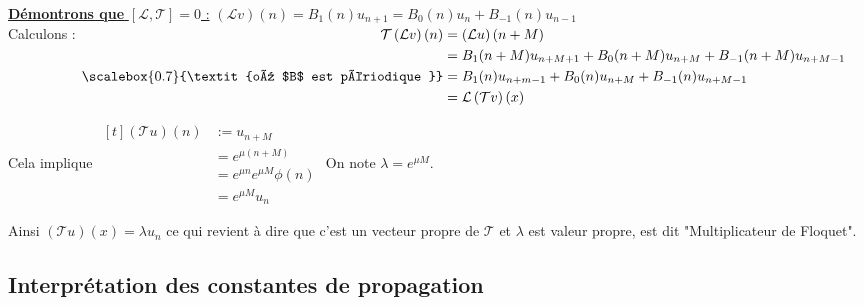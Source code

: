 \documentclass[12pt,a4paper]{article}
\begin{document}
	\vspace{-.5cm}
	
	\underline{\textbf{Démontrons que} $\left[\mathcal L, \mathcal T\right] = 0$ :} $\left(\mathcal L v\right)(n) = B_1(n)u_{n+1} = B_0(n)u_n + B_{-1}(n)u_{n-1}$\\
	
	Calculons : $\begin{aligned}[t]
		\mathcal T\left(\mathcal L v\right)(n) 
		&= \left(\mathcal L u\right)(n+M)\\
		&= B_1(n+M)u_{n+M+1} + B_0(n+M)u_{n+M} + B_{-1}(n+M)u_{n+M-1}\\
		\text{\scalebox{0.7}{\textit{où $B$ est périodique  }}} &= B_1(n)u_{n+m-1} + B_0(n)u_{n+M} + B_{-1}(n)u_{n+M-1}\\
		&= \mathcal L\left(\mathcal T v\right)(x) 
	\end{aligned}$
	
	
	Cela implique $\begin{aligned}[t]
		\left(\mathcal T u\right)(n) 
		&:= u_{n+M} \\
		&= e^{\mu(n+M)}\\
		&=  e^{\mu n}e^{\mu M}\phi(n)\\
		&= e^{\mu M}u_n
	\end{aligned}$
	\hspace{1cm} On note \underline{$\lambda = e^{\mu M}$}.
	
	\hspace{-1cm}\begin{minipage}[t]{20cm}
		Ainsi $\left(\mathcal T u\right)(x) = \lambda u_n$ ce qui revient à dire que c'est un vecteur propre de $\mathcal T$ et $\lambda$ est valeur propre, est dit "Multiplicateur de Floquet".
	\end{minipage}
	
	\subsection{Interprétation des constantes de propagation}
	
\end{document}
